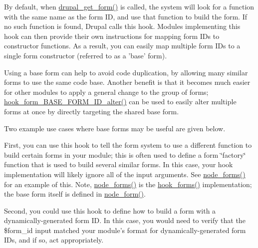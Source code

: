By default, when \hyperlink{group__form__api_ga720df81a837b06dfe19daf1c1eea3437}{drupal\_\-get\_\-form()} is called, the system will look for a function with the same name as the form ID, and use that function to build the form. If no such function is found, Drupal calls this hook. Modules implementing this hook can then provide their own instructions for mapping form IDs to constructor functions. As a result, you can easily map multiple form IDs to a single form constructor (referred to as a 'base' form).

Using a base form can help to avoid code duplication, by allowing many similar forms to use the same code base. Another benefit is that it becomes much easier for other modules to apply a general change to the group of forms; \hyperlink{group__hooks_gaf0cfc224a88c8823da68856c30a4841a}{hook\_\-form\_\-BASE\_\-FORM\_\-ID\_\-alter()} can be used to easily alter multiple forms at once by directly targeting the shared base form.

Two example use cases where base forms may be useful are given below.

First, you can use this hook to tell the form system to use a different function to build certain forms in your module; this is often used to define a form \char`\"{}factory\char`\"{} function that is used to build several similar forms. In this case, your hook implementation will likely ignore all of the input arguments. See \hyperlink{node_8module_aeb7774b7406a9dcba3c7f587a520df31}{node\_\-forms()} for an example of this. Note, \hyperlink{node_8module_aeb7774b7406a9dcba3c7f587a520df31}{node\_\-forms()} is the \hyperlink{group__hooks_gaa764fee74b85797f75c0c923cad628d5}{hook\_\-forms()} implementation; the base form itself is defined in \hyperlink{group__forms_ga267299500e205db099ee4e8396769d3f}{node\_\-form()}.

Second, you could use this hook to define how to build a form with a dynamically-\/generated form ID. In this case, you would need to verify that the \$form\_\-id input matched your module's format for dynamically-\/generated form IDs, and if so, act appropriately.


